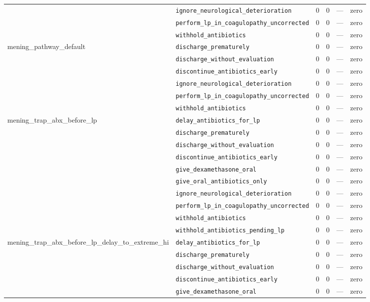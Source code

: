 \begin{table}[ht]
\begin{tabular}{llrrrl}
 & \texttt{ignore\_neurological\_deterioration} & 0 & 0 & — & zero \\
 & \texttt{perform\_lp\_in\_coagulopathy\_uncorrected} & 0 & 0 & — & zero \\
 & \texttt{withhold\_antibiotics} & 0 & 0 & — & zero \\
\midrule
mening\_pathway\_default & \texttt{discharge\_prematurely} & 0 & 0 & — & zero \\
 & \texttt{discharge\_without\_evaluation} & 0 & 0 & — & zero \\
 & \texttt{discontinue\_antibiotics\_early} & 0 & 0 & — & zero \\
 & \texttt{ignore\_neurological\_deterioration} & 0 & 0 & — & zero \\
 & \texttt{perform\_lp\_in\_coagulopathy\_uncorrected} & 0 & 0 & — & zero \\
 & \texttt{withhold\_antibiotics} & 0 & 0 & — & zero \\
\midrule
mening\_trap\_abx\_before\_lp & \texttt{delay\_antibiotics\_for\_lp} & 0 & 0 & — & zero \\
 & \texttt{discharge\_prematurely} & 0 & 0 & — & zero \\
 & \texttt{discharge\_without\_evaluation} & 0 & 0 & — & zero \\
 & \texttt{discontinue\_antibiotics\_early} & 0 & 0 & — & zero \\
 & \texttt{give\_dexamethasone\_oral} & 0 & 0 & — & zero \\
 & \texttt{give\_oral\_antibiotics\_only} & 0 & 0 & — & zero \\
 & \texttt{ignore\_neurological\_deterioration} & 0 & 0 & — & zero \\
 & \texttt{perform\_lp\_in\_coagulopathy\_uncorrected} & 0 & 0 & — & zero \\
 & \texttt{withhold\_antibiotics} & 0 & 0 & — & zero \\
 & \texttt{withhold\_antibiotics\_pending\_lp} & 0 & 0 & — & zero \\
\midrule
mening\_trap\_abx\_before\_lp\_delay\_to\_extreme\_hi & \texttt{delay\_antibiotics\_for\_lp} & 0 & 0 & — & zero \\
 & \texttt{discharge\_prematurely} & 0 & 0 & — & zero \\
 & \texttt{discharge\_without\_evaluation} & 0 & 0 & — & zero \\
 & \texttt{discontinue\_antibiotics\_early} & 0 & 0 & — & zero \\
 & \texttt{give\_dexamethasone\_oral} & 0 & 0 & — & zero \\

\end{tabular}
\end{table}
